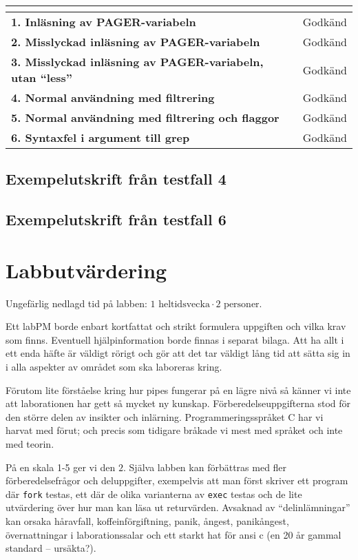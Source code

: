 \documentclass[a4paper,10pt]{article}
\begin{document}
\begin{tabularx}{\textwidth}{>{\bfseries}l  X }
	\multicolumn{2}{c}{\large\textbf{Testfallsresultat}} \\[0.1cm]
	\toprule
	1. Inläsning av PAGER-variabeln 							& Godkänd \\
	2. Misslyckad inläsning av PAGER-variabeln					& Godkänd \\
	3. Misslyckad inläsning av PAGER-variabeln, utan ``less''	& Godkänd \\
	4. Normal användning med filtrering 						& Godkänd \\
	5. Normal användning med filtrering och flaggor				& Godkänd \\
	6. Syntaxfel i argument till grep							& Godkänd \\
	\bottomrule
\end{tabularx}

\subsection{Exempelutskrift från testfall 4}



\subsection{Exempelutskrift från testfall 6}



\section{Labbutvärdering}

Ungefärlig nedlagd tid på labben: $1 \text{ heltidsvecka} \cdot 2 \text{ personer}$.

Ett labPM borde enbart kortfattat och strikt formulera uppgiften och vilka krav som finns.
Eventuell hjälpinformation borde finnas i separat bilaga. Att ha allt i ett enda häfte är väldigt rörigt och gör att det tar väldigt lång tid att sätta sig in i alla aspekter av området som ska laboreras kring.

Förutom lite förståelse kring hur pipes fungerar på en lägre nivå så känner vi inte att laborationen har gett så mycket ny kunskap. Förberedelseuppgifterna stod för den större delen av insikter och inlärning. Programmeringsspråket C har vi harvat med förut; och precis som tidigare bråkade vi mest med språket och inte med teorin.

På en skala 1-5 ger vi den $2$. Själva labben kan förbättras med fler förberedelsefrågor och deluppgifter, exempelvis att man först skriver ett program där \verb!fork! testas, ett där de olika varianterna av \verb!exec! testas och de lite utvärdering över hur man kan läsa ut returvärden. Avsaknad av ``delinlämningar'' kan orsaka håravfall, koffeinförgiftning, panik, ångest, panikångest, övernattningar i laborationssalar och ett starkt hat för ansi c (en 20 år gammal standard -- ursäkta?).
\end{document}
